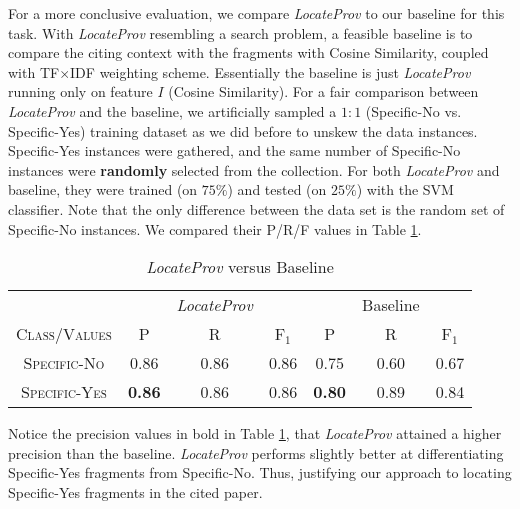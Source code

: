 For a more conclusive evaluation, we compare \textit{LocateProv} to our baseline for this task. With \textit{LocateProv} resembling a search problem, a feasible baseline is to compare the citing context with the fragments with Cosine Similarity, coupled with TF$\times$IDF \cite{irtextbook} weighting scheme. Essentially the baseline is just \textit{LocateProv} running only on feature $I$ (Cosine Similarity). For a fair comparison between \textit{LocateProv} and the baseline, we artificially sampled a $1:1$ (Specific-No vs. Specific-Yes) training dataset as we did before to unskew the data instances. Specific-Yes instances were gathered, and the same number of Specific-No instances were \textbf{randomly} selected from the collection. For both \textit{LocateProv} and baseline, they were trained (on $75\%$) and tested (on $25\%$)  with the SVM classifier. Note that the only difference between the data set is the random set of Specific-No instances. We compared their P/R/F values in Table \ref{tab:locateprov_vs_baseline}.

\begin{table}[h]
	\center
	\begin{tabular}{ c | c  c  c | c c c }
		& & {\it LocateProv} & & & Baseline \\
		\textsc{Class/Values} & \textsc{P} & \textsc{R} & \textsc{F$_1$} & \textsc{P} & \textsc{R} & \textsc{F$_1$}  \\
		\hline
		\textsc{Specific-No} 			& 0.86  &    0.86   &   0.86 & 0.75   &   0.60   &   0.67 \\
		\textsc{Specific-Yes} 			& {\bf 0.86}  &    0.86   &   0.86 & {\bf 0.80}   &   0.89   &   0.84 \\
	\end{tabular}
	\caption{{\it LocateProv} versus Baseline}
	\label{tab:locateprov_vs_baseline}
\end{table}
Notice the precision values in bold in Table \ref{tab:locateprov_vs_baseline}, that {\it LocateProv} attained a higher precision than the baseline. {\it LocateProv} performs slightly better at differentiating Specific-Yes fragments from Specific-No. Thus, justifying our approach to locating Specific-Yes fragments in the cited paper.
